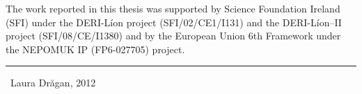 

\vspace*{1cm} 
\vfill
\begin{small}
The work reported in this thesis was supported by Science Foundation Ireland (SFI) under the DERI-L\'{i}on project (SFI/02/CE1/I131) and the DERI-L\'{i}on--II project (SFI/08/CE/I1380) and by the European Union 6th Framework under the NEPOMUK IP (FP6-027705) project.
\end{small}
\bigskip
\begin{center}
\hrule
\bigskip
\ccby~Laura Dr\u{a}gan, 2012
\end{center}

\cleardoublepage


\cleardoublepage
\tableofcontents

\listoffigures
\listoftables
\lstlistoflistings
{}

